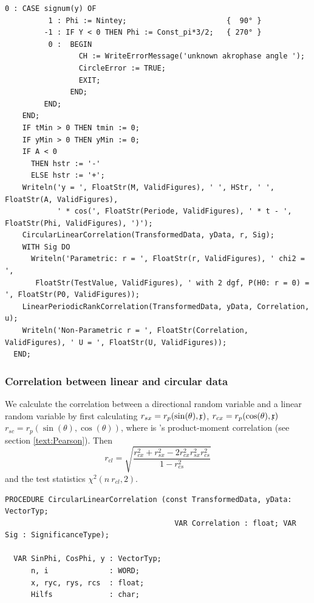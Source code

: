 \begin{refsection}
\begin{lstlisting}[caption=Fit a trigonometric polynomial]
     0 : CASE signum(y) OF
          1 : Phi := Nintey;                       {  90° }
         -1 : IF Y < 0 THEN Phi := Const_pi*3/2;   { 270° }
          0 :  BEGIN
                 CH := WriteErrorMessage('unknown akrophase angle ');
                 CircleError := TRUE;
                 EXIT;
               END;
         END;
    END;
    IF tMin > 0 THEN tmin := 0;
    IF yMin > 0 THEN yMin := 0;
    IF A < 0
      THEN hstr := '-'
      ELSE hstr := '+';
    Writeln('y = ', FloatStr(M, ValidFigures), ' ', HStr, ' ', FloatStr(A, ValidFigures),
            ' * cos(', FloatStr(Periode, ValidFigures), ' * t - ', FloatStr(Phi, ValidFigures), ')');
    CircularLinearCorrelation(TransformedData, yData, r, Sig);
    WITH Sig DO
      Writeln('Parametric: r = ', FloatStr(r, ValidFigures), ' chi2 = ',
       FloatStr(TestValue, ValidFigures), ' with 2 dgf, P(H0: r = 0) = ', FloatStr(P0, ValidFigures));
    LinearPeriodicRankCorrelation(TransformedData, yData, Correlation, u);
    Writeln('Non-Parametric r = ', FloatStr(Correlation, ValidFigures), ' U = ', FloatStr(U, ValidFigures));
  END;
\end{lstlisting}

\subsubsection{Correlation  between linear and circular data}

We calculate the correlation between a directional random variable \skalar{\theta} and a linear random variable  by first calculating \( r_{sx} = r_p(\sin(\theta), \mathfrak{x}) \), \( r_{cx} = r_p(\cos(\theta), \mathfrak{x}) \) \( r_{sc} = r_p(\sin(\theta), \cos(\theta)) \), where  is 's product-moment correlation (see section \ref{text:Pearson}). Then
\begin{equation}
  r_{cl} = \sqrt{\frac{r^2_{cx} + r^2_{sx} -  2 r^2_{cx} r^2_{sx} r^2_{cs}}{1 - r^2_{cs}}}
\end{equation}
and the test statistics \( \chi^2(n\ r_{cl}, 2) \).

\begin{lstlisting}[caption=Correlation between linear and circular data]
  PROCEDURE CircularLinearCorrelation (const TransformedData, yData: VectorTyp;
                                       VAR Correlation : float; VAR Sig : SignificanceType);

  VAR SinPhi, CosPhi, y : VectorTyp;
      n, i              : WORD;
      x, ryc, rys, rcs  : float;
      Hilfs             : char;


\end{lstlisting}
\end{refsection}
